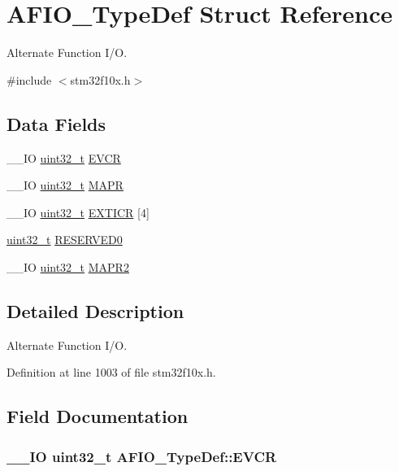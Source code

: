 \hypertarget{struct_a_f_i_o___type_def}{\section{A\-F\-I\-O\-\_\-\-Type\-Def Struct Reference}
\label{struct_a_f_i_o___type_def}
}


Alternate Function I/\-O.  




{\ttfamily \#include $<$stm32f10x.\-h$>$}

\subsection*{Data Fields}
\begin{DoxyCompactItemize}
\item 
\-\_\-\-\_\-\-I\-O \hyperlink{stdint_8h_a435d1572bf3f880d55459d9805097f62}{uint32\-\_\-t} \hyperlink{struct_a_f_i_o___type_def_a377d5227cd20950e4489cd04df16500f}{E\-V\-C\-R}
\item 
\-\_\-\-\_\-\-I\-O \hyperlink{stdint_8h_a435d1572bf3f880d55459d9805097f62}{uint32\-\_\-t} \hyperlink{struct_a_f_i_o___type_def_a2b44ba1a427df7d8c0b254f869b9b463}{M\-A\-P\-R}
\item 
\-\_\-\-\_\-\-I\-O \hyperlink{stdint_8h_a435d1572bf3f880d55459d9805097f62}{uint32\-\_\-t} \hyperlink{struct_a_f_i_o___type_def_a5f590aa12271be60c2f61b0a6d2b8772}{E\-X\-T\-I\-C\-R} \mbox{[}4\mbox{]}
\item 
\hyperlink{stdint_8h_a435d1572bf3f880d55459d9805097f62}{uint32\-\_\-t} \hyperlink{struct_a_f_i_o___type_def_a6cf52816787797115664f0c8167a92b9}{R\-E\-S\-E\-R\-V\-E\-D0}
\item 
\-\_\-\-\_\-\-I\-O \hyperlink{stdint_8h_a435d1572bf3f880d55459d9805097f62}{uint32\-\_\-t} \hyperlink{struct_a_f_i_o___type_def_a4420b9fe25158ac2e5e32f6ad9d1b6ca}{M\-A\-P\-R2}
\end{DoxyCompactItemize}


\subsection{Detailed Description}
Alternate Function I/\-O. 

Definition at line 1003 of file stm32f10x.\-h.



\subsection{Field Documentation}
\hypertarget{struct_a_f_i_o___type_def_a377d5227cd20950e4489cd04df16500f}{
\subsubsection[{E\-V\-C\-R}]{\setlength{\rightskip}{0pt plus 5cm}\-\_\-\-\_\-\-I\-O {\bf uint32\-\_\-t} A\-F\-I\-O\-\_\-\-Type\-Def\-::\-E\-V\-C\-R}}\label{struct_a_f_i_o___type_def_a377d5227cd20950e4489cd04df16500f}


